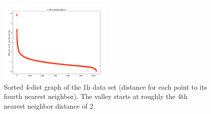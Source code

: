 \begin{figure}[h]
  \centering
  \includegraphics[width=0.5\textwidth]{./images/kDistGraphDBSCAN3h.png}
  \caption{Sorted 4-dist graph of the 1h data set (distance for each point to its fourth nearest neighbor). The valley starts at roughly the 4th nearest neighbor distance of 2.}
  \label{figure:kDistGraphDBSCAN3h}
\end{figure}






  
